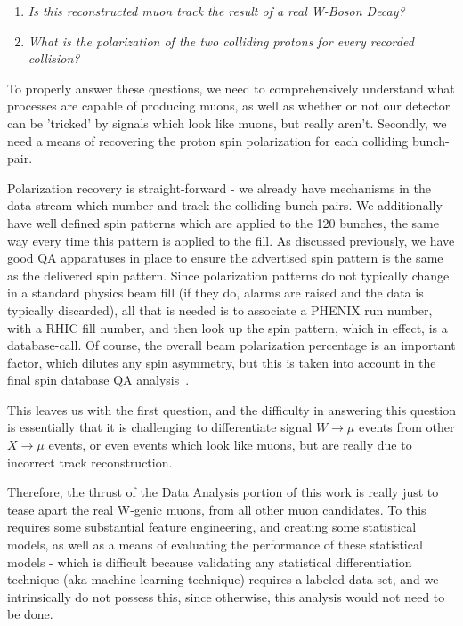 \begin{enumerate}
  \item \textit{Is this reconstructed muon track the result of a real W-Boson Decay?}
  \item \textit{What is the polarization of the two colliding protons for every recorded collision?}
\end{enumerate}

To properly answer these questions, we need to comprehensively understand what
processes are capable of producing muons, as well as whether or not our detector
can be 'tricked' by signals which look like muons, but really aren't. Secondly,
we need a means of recovering the proton spin polarization for each colliding
bunch-pair.

Polarization recovery is straight-forward - we already have mechanisms in the
data stream which number and track the colliding bunch pairs. We additionally
have well defined spin patterns which are applied to the 120 bunches, the same
way every time this pattern is applied to the fill. As discussed previously, we
have good QA apparatuses in place to ensure the advertised spin pattern is the
same as the delivered spin pattern. Since polarization patterns do not typically
change in a standard physics beam fill (if they do, alarms are raised and the
data is typically discarded), all that is needed is to associate a PHENIX run
number, with a RHIC fill number, and then look up the spin pattern, which in
effect, is a database-call. Of course, the overall beam polarization percentage
is an important factor, which dilutes any spin asymmetry, but this is taken into
account in the final spin database QA analysis~\cite{Kim2014}.

This leaves us with the first question, and the difficulty in answering this
question is essentially that it is challenging to differentiate signal
$W\rightarrow\mu$ events from other $X\rightarrow\mu$ events, or even events
which look like muons, but are really due to incorrect track reconstruction.

Therefore, the thrust of the Data Analysis portion of this work is really just
to tease apart the real W-genic muons, from all other muon candidates. To this
requires some substantial feature engineering, and creating some statistical
models, as well as a means of evaluating the performance of these statistical
models - which is difficult because validating any statistical differentiation
technique (aka machine learning technique) requires a labeled data set, and we
intrinsically do not possess this, since otherwise, this analysis would not need
to be done.

